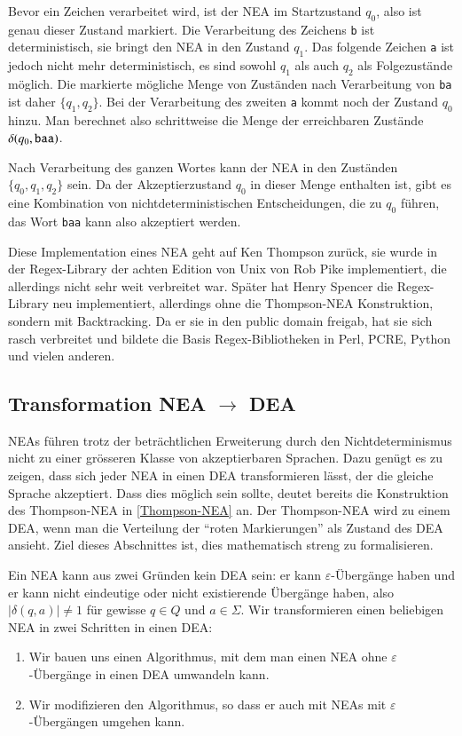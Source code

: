 Bevor ein Zeichen verarbeitet wird,
ist der NEA im Startzustand $q_0$, also ist genau dieser Zustand
markiert.
Die Verarbeitung des Zeichens {\tt b} ist deterministisch,
sie bringt den NEA in den Zustand $q_1$.
Das folgende Zeichen {\tt a}
ist jedoch nicht mehr deterministisch, es sind sowohl $q_1$ als auch
$q_2$ als Folgezustände möglich.
Die markierte mögliche Menge von Zuständen nach Verarbeitung von {\tt ba}
ist daher $\{q_1,q_2\}$.
Bei der Verarbeitung des zweiten {\tt a} kommt noch der Zustand $q_0$ hinzu.
Man berechnet also schrittweise die
Menge der erreichbaren Zustände $\delta(q_0,{\tt baa})$.

Nach Verarbeitung des ganzen Wortes kann der NEA in den Zuständen
$\{q_0,q_1,q_2\}$ sein.
Da der Akzeptierzustand $q_0$ in dieser Menge
enthalten ist, gibt es eine Kombination von nichtdeterministischen
Entscheidungen, die zu $q_0$ führen, das Wort {\tt baa} kann also
akzeptiert werden.

%
%
Diese Implementation eines NEA geht auf Ken Thompson zurück, sie wurde in
der Regex-Library der achten Edition von Unix von Rob Pike
%
implementiert, die allerdings nicht sehr weit verbreitet war.
Später hat Henry Spencer die Regex-Library neu
implementiert, allerdings ohne die Thompson-NEA Konstruktion, sondern
mit Backtracking.
Da er sie in den public domain freigab, hat sie sich
rasch verbreitet und bildete die Basis Regex-Bibliotheken in Perl, PCRE,
Python und vielen anderen.

\subsection{Transformation NEA \texorpdfstring{$\rightarrow$}{->} DEA\label{regulaer:nea-dea}}
NEAs führen trotz der beträchtlichen Erweiterung durch den
Nichtdeterminismus nicht zu einer grösseren Klasse von akzeptierbaren
Sprachen.
Dazu genügt es zu zeigen, dass sich jeder NEA in einen DEA
transformieren lässt, der die gleiche Sprache akzeptiert.
Dass dies möglich sein sollte, deutet bereits die Konstruktion
des Thompson-NEA in \ref{Thompson-NEA} an.
Der Thompson-NEA wird zu einem DEA, wenn man die Verteilung der
``roten Markierungen'' als Zustand des DEA ansieht.
Ziel dieses Abschnittes ist, dies
mathematisch streng zu formalisieren.

Ein NEA kann aus zwei Gründen kein DEA sein:
er kann $\varepsilon$-Übergänge haben und er kann nicht eindeutige
oder nicht existierende Übergänge haben, also $|\delta(q,a)|\ne 1$
für gewisse $q\in Q$ und $a\in\Sigma$.
Wir transformieren einen 
beliebigen NEA in zwei Schritten in einen DEA:
\begin{enumerate}
\item Wir bauen uns einen Algorithmus, mit dem man einen NEA ohne
$\varepsilon$-Übergänge in einen DEA umwandeln kann.
\item Wir modifizieren den Algorithmus, so dass er auch mit NEAs mit
$\varepsilon$-Übergängen umgehen kann.
\end{enumerate}

